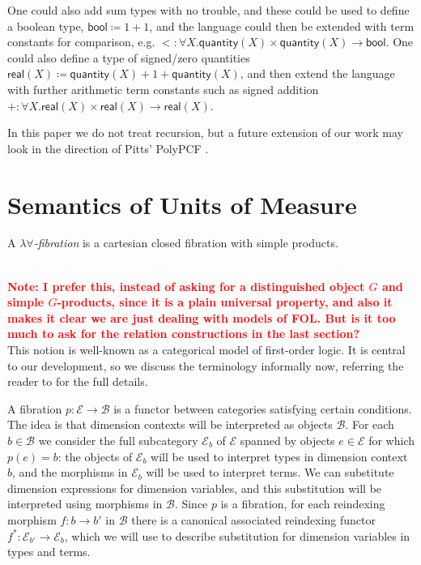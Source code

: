 \documentclass[a4paper,UKenglish]{lipics}
\newcommand\note[1]{{ \bf \textcolor{red} {\vspace{2mm}\; \\ Note: #1\\}}}
\newcommand{\UoM}{Units of Measure\xspace}
\newcommand{\msf}[1]{\mathsf{#1}} %
\newcommand{\B}{\mathcal{B}}
\newcommand{\E}{\mathcal{E}}
\newcommand{\num}{\msf{quantity}}
\newcommand{\sreal}{\msf{real}}
\newcommand{\bool}{\msf{bool}}
\newcommand{\Dvar}{X}
\begin{document}
One could also add sum types with no trouble, and these could be used to
define a boolean type,
$\bool\coloneqq 1+1$,
and the language could then be extended with term constants for comparison, e.g.
${<}:\forall \Dvar.\num(\Dvar)\times \num(\Dvar)\to \bool$.
One could also define a type of signed/zero quantities
$\sreal(\Dvar)\coloneqq \num(\Dvar)+1+\num(\Dvar)$,
and then extend the language with further arithmetic term constants such as signed addition
$+:\forall \Dvar.\sreal(\Dvar)\times \sreal(\Dvar)\to\sreal(\Dvar)$.

In this paper we do not treat recursion, but a future extension of our work may look in the direction of Pitts' PolyPCF \cite{pitts2000parametric}.






\section{Semantics of \UoM} \label{sec:sem}


\begin{definition}
A \emph{$\lambda\forall$-fibration}
is a cartesian closed fibration
with simple products.
\end{definition}
\note{I prefer this, instead of asking for a distinguished object $G$
  and simple $G$-products, since it is a plain universal property, and
  also it makes it clear we are just dealing with models of FOL.  But
  is it too much to ask for the relation constructions in the last
  section?}
This notion is well-known as a categorical model of first-order logic. It is central to our
development, so we discuss the terminology informally now, referring
the reader to \cite{jacobs1999categorical} for the full details.

A fibration $p:\E\to\B$ is a functor between categories satisfying certain conditions.
The idea is that dimension contexts will be interpreted as objects
$\B$. For each $b\in\B$ we consider the full subcategory $\E_b$ of $\E$
spanned by objects $e\in\E$ for which $p(e)=b$:
the objects of $\E_b$ will be used to interpret types in dimension context $b$,
and the morphisms in $\E_b$ will be used to interpret terms.
We can substitute dimension expressions for dimension variables, and this substitution
will be interpreted using morphisms in $\B$.
Since $p$ is a fibration, for each reindexing morphism $f:b\to b'$ in $\B$ there is a
canonical associated reindexing functor $f^*:\E_{b'}\to \E_b$, which we will use
to describe substitution for dimension variables in types and terms.
\end{document}
